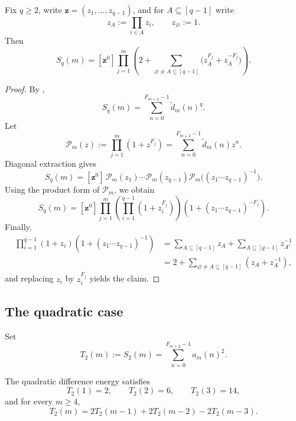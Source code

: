 \begin{corollary}
\label{cor:multivariate-moment-kernel}
Fix \(q\ge 2\), write \(\mathbf z=(z_1,\dots,z_{q-1})\), and for
\(A\subseteq [q-1]\) write
\[
  z_A:=\prod_{i\in A}z_i,
  \qquad
  z_\varnothing:=1.
\]
Then
\[
  S_q(m)
  =
  [\mathbf z^0]
  \prod_{j=1}^m
  \left(
    2+\sum_{\varnothing\neq A\subseteq [q-1]}
    \bigl(z_A^{F_j}+z_A^{-F_j}\bigr)
  \right).
\]
\end{corollary}

\begin{proof}
By ,
\[
  S_q(m)
  =
  \sum_{n=0}^{F_{m+2}-1}\widetilde d_m(n)^q.
\]
Let
\[
  \mathcal P_m(z):=\prod_{j=1}^m(1+z^{F_j})
  =
  \sum_{n=0}^{F_{m+2}-1}\widetilde d_m(n)z^n.
\]
Diagonal extraction gives
\[
  S_q(m)
  =
  [\mathbf z^0]\,
  \mathcal P_m(z_1)\cdots \mathcal P_m(z_{q-1})
  \mathcal P_m\bigl((z_1\cdots z_{q-1})^{-1}\bigr).
\]
Using the product form of \(\mathcal P_m\), we obtain
\[
  S_q(m)
  =
  [\mathbf z^0]
  \prod_{j=1}^m
  \left(
    \prod_{i=1}^{q-1}(1+z_i^{F_j})
  \right)
  \left(
    1+(z_1\cdots z_{q-1})^{-F_j}
  \right).
\]
Finally,
\begin{align*}
  \prod_{i=1}^{q-1}(1+z_i)\left(1+(z_1\cdots z_{q-1})^{-1}\right)
  &=
  \sum_{A\subseteq [q-1]}z_A
  +
  \sum_{A\subseteq [q-1]}z_{A^c}^{-1} \\
  &=
  2+\sum_{\varnothing\neq A\subseteq [q-1]}(z_A+z_A^{-1}),
\end{align*}
and replacing \(z_i\) by \(z_i^{F_j}\) yields the claim.
\end{proof}

\subsection{The quadratic case}

\begin{definition}
\label{def:T2}
Set
\[
  T_2(m):=S_2(m)=\sum_{n=0}^{F_{m+2}-1} a_m(n)^2.
\]
\end{definition}

\begin{theorem}
\label{thm:cubic-recurrence}
The quadratic difference energy satisfies
\[
  T_2(1)=2,\qquad T_2(2)=6,\qquad T_2(3)=14,
\]
and for every \(m\ge 4\),
\[
  T_2(m)=2T_2(m-1)+2T_2(m-2)-2T_2(m-3).
\]
\end{theorem}

